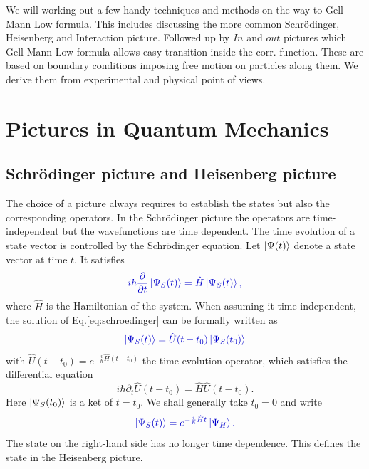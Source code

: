 \documentclass[12pt, titlepage]{article}
\begin{document}
We will working out a few handy techniques and methods on the way to Gell-Mann Low formula. This includes discussing the more common Schrödinger, Heisenberg and Interaction picture. Followed up by $ In $ and $ out $ pictures which Gell-Mann Low formula allows easy transition inside the corr. function. These are based on boundary conditions imposing free motion on particles along them. We derive them from experimental and physical point of views.
\section{Pictures in Quantum Mechanics }\label{Pictures in Quantum Mechanics}
\subsection{Schrödinger picture and Heisenberg picture}\label{SHpicture}
The choice of a picture always requires to establish the states but also the corresponding operators. 
In the Schrödinger picture the operators are time-independent but the wavefunctions are time dependent. The time evolution of a state vector is controlled by the Schrödinger equation. Let $ \ket{\Psi(t)} $ denote a state vector at time $ t $. It satisfies
\begin{equation}\label{eq:schroedinger}
\textcolor[RGB]{0,0,204}{
i \hbar \frac{\partial }{\partial t} \ket{\Psi_{S}(t)} =
\hat{H} \ket{\Psi_{S}(t)},
}
\end{equation}
where $ \hat{H} $ is the Hamiltonian of the system. When assuming it time independent, the solution of Eq.\enskip\eqref{eq:schroedinger} can be formally written as 
\begin{equation}\label{eq:time_ev_op_schr}
\textcolor[RGB]{0,0,204}{
\ket{\Psi_{S}(t)} 
=\hat{U}(t-t_{0})\ket{\Psi_{S}(t_0)}
}
\end{equation}
with $ \hat{U}(t-t_{0}) = e^{-\frac{i}{\hbar}\hat{H}(t-t_{0})} $ the time evolution operator, which satisfies the differential equation 
\begin{equation}\label{evo_U_1}
i\hbar\partial_{t}\hat{U}(t-t_{0})=\hat{H}\hat{U}(t-t_{0})
. 
\end{equation}
 Here $ \ket{\Psi_{S}(t_0)} $ is a ket of $ t=t_{0} $. We shall generally take $ t_{0}=0 $ and write
\begin{equation}\label{eq:phi_s_and_phi_h}
\textcolor[RGB]{0,0,204}{
\ket{\Psi_{S}(t)} 
= e^{-\frac{i}{\hbar}\hat{H}t}
\ket{\Psi_{H}}.
}
\end{equation}
The state on the right-hand side has no longer time dependence. This defines the  state in the Heisenberg picture.
\end{document}
